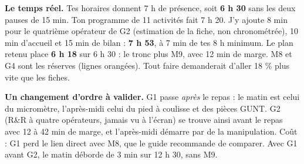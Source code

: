 \documentclass[10pt,a4paper]{article}
\begin{document}
\thispagestyle{fancy}
\vspace{2pt}
\begin{tcolorbox}[boite,left=5pt,right=5pt,top=2pt,bottom=2pt]\small
\textbf{Le temps réel.} Tes horaires donnent 7 h de présence, soit \textbf{6 h 30} sans les deux pauses de 15 min. Ton programme de 11 activités fait 7 h 20. J'y ajoute 8 min pour le quatrième opérateur de G2 (estimation de la fiche, non chronométrée), 10 min d'accueil et 15 min de bilan : \textbf{7 h 53}, à 7 min de tes 8 h minimum. Le plan retenu place \textbf{6 h 18} sur 6 h 30 : le tronc plus M9, avec 12 min de marge. M8 et G4 sont les réserves (lignes orangées). Tout faire demanderait d'aller 18 \% plus vite que les fiches.

\textbf{Un changement d'ordre à valider.} G1 passe \emph{après} le repas : le matin est celui du micromètre, l'après-midi celui du pied à coulisse et des pièces GUNT. G2 (R\&R à quatre opérateurs, jamais vu à l'écran) se trouve ainsi avant le repas avec 12 à 42 min de marge, et l'après-midi démarre par de la manipulation. Coût : G1 perd le lien direct avec M8, que le guide recommande de comparer. Avec G1 avant G2, le matin déborde de 3 min sur 12 h 30, sans M9.
\end{tcolorbox}
\par\vspace{4pt}
\renewcommand{\arraystretch}{1.1}\small
\end{document}

